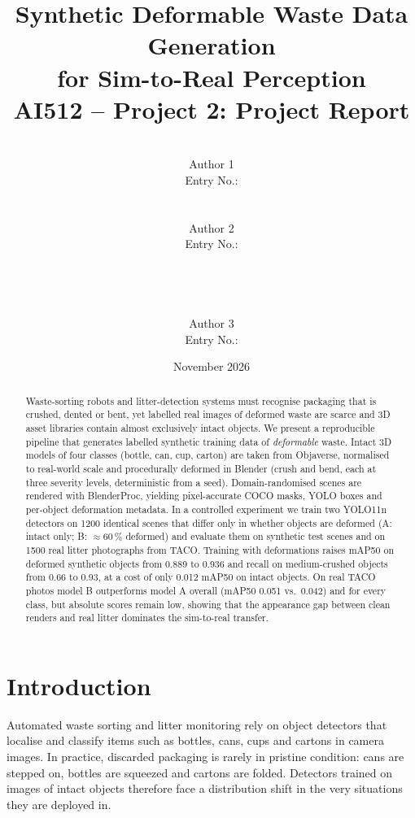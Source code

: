 \documentclass[11pt,a4paper]{article}
\title{\textbf{Synthetic Deformable Waste Data Generation\\for Sim-to-Real Perception}\\[6pt]
\large AI512 -- Project 2: Project Report}
\author{
\begin{tabular}{c}
\rule{6cm}{0.4pt}\\[-2pt]
\small Author 1 \\[4pt]
\small Entry No.: \rule{3.5cm}{0.4pt}
\end{tabular}
\quad
\begin{tabular}{c}
\rule{6cm}{0.4pt}\\[-2pt]
\small Author 2 \\[4pt]
\small Entry No.: \rule{3.5cm}{0.4pt}
\end{tabular}
\\[18pt]
\begin{tabular}{c}
\rule{6cm}{0.4pt}\\[-2pt]
\small Author 3 \\[4pt]
\small Entry No.: \rule{3.5cm}{0.4pt}
\end{tabular}
}
\date{November 2026}
\begin{document}
\maketitle

\begin{abstract}
Waste-sorting robots and litter-detection systems must recognise packaging that is crushed,
dented or bent, yet labelled real images of deformed waste are scarce and 3D asset libraries
contain almost exclusively intact objects. We present a reproducible pipeline that generates
labelled synthetic training data of \emph{deformable} waste. Intact 3D models of four classes
(bottle, can, cup, carton) are taken from Objaverse, normalised to real-world scale and
procedurally deformed in Blender (crush and bend, each at three severity levels, deterministic
from a seed). Domain-randomised scenes are rendered with BlenderProc, yielding pixel-accurate
COCO masks, YOLO boxes and per-object deformation metadata. In a controlled experiment we train
two YOLO11n detectors on 1200 identical scenes that differ only in whether objects are deformed
(A: intact only; B: $\approx$60\,\% deformed) and evaluate them on synthetic test scenes and on
1500 real litter photographs from TACO. Training with deformations raises mAP50 on deformed
synthetic objects from 0.889 to 0.936 and recall on medium-crushed objects from 0.66 to 0.93,
at a cost of only 0.012 mAP50 on intact objects. On real TACO photos model B outperforms model A
overall (mAP50 0.051 vs.\ 0.042) and for every class, but absolute scores remain low, showing
that the appearance gap between clean renders and real litter dominates the sim-to-real
transfer.
\end{abstract}

\tableofcontents
\newpage

\section{Introduction}

Automated waste sorting and litter monitoring rely on object detectors that localise and
classify items such as bottles, cans, cups and cartons in camera images. In practice, discarded
packaging is rarely in pristine condition: cans are stepped on, bottles are squeezed and cartons
are folded. Detectors trained on images of intact objects therefore face a distribution shift
in the very situations they are deployed in.
\end{document}
